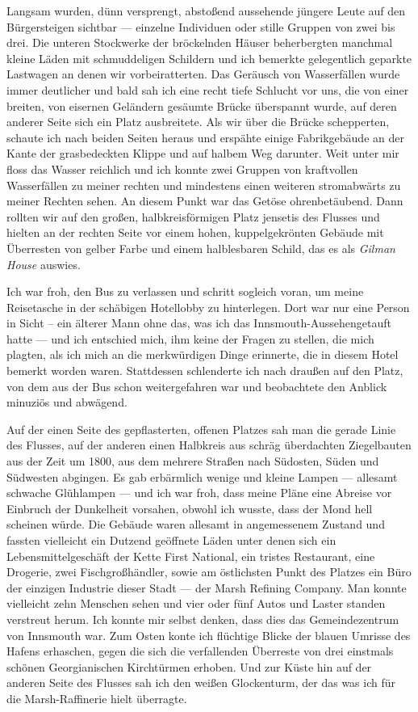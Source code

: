 Langsam wurden, dünn versprengt, abstoßend aussehende jüngere Leute auf den Bürgersteigen sichtbar --- einzelne Individuen oder stille Gruppen von zwei bis drei. Die unteren Stockwerke der bröckelnden Häuser beherbergten manchmal kleine Läden mit schmuddeligen Schildern und ich bemerkte gelegentlich geparkte Lastwagen an denen wir vorbeiratterten. Das Geräusch von Wasserfällen wurde immer deutlicher und bald sah ich eine recht tiefe Schlucht vor uns, die von einer breiten, von eisernen Geländern gesäumte Brücke überspannt wurde, auf deren anderer Seite sich ein Platz ausbreitete. Als wir über die Brücke schepperten, schaute ich nach beiden Seiten heraus und erspähte einige Fabrikgebäude an der Kante der grasbedeckten Klippe und auf halbem Weg darunter. Weit unter mir floss das Wasser reichlich und ich konnte zwei Gruppen von kraftvollen Wasserfällen zu meiner rechten und mindestens einen weiteren stromabwärts zu meiner Rechten sehen. An diesem Punkt war das Getöse ohrenbetäubend. Dann rollten wir auf den großen, halbkreisförmigen Platz jensetis des Flusses und hielten an der rechten Seite vor einem hohen, kuppelgekrönten Gebäude mit Überresten von gelber Farbe und einem halblesbaren Schild, das es als \textit{Gilman House} auswies.

Ich war froh, den Bus zu verlassen und schritt sogleich voran, um meine Reisetasche in der schäbigen Hotellobby zu hinterlegen. Dort war nur eine Person in Sicht -- ein älterer Mann ohne das, was ich das \glqq Innsmouth-Aussehen\grqq  getauft hatte --- und ich entschied mich, ihm keine der Fragen zu stellen, die mich plagten, als ich mich an die merkwürdigen Dinge erinnerte, die in diesem Hotel bemerkt worden waren. Stattdessen schlenderte ich nach draußen auf den Platz, von dem aus der Bus schon weitergefahren war und beobachtete den Anblick minuziös und abwägend.

Auf der einen Seite des gepflasterten, offenen Platzes sah man die gerade Linie des Flusses, auf der anderen einen Halbkreis aus schräg überdachten Ziegelbauten aus der Zeit um 1800, aus dem mehrere Straßen nach Südosten, Süden und Südwesten abgingen. Es gab erbärmlich wenige und kleine Lampen --- allesamt schwache Glühlampen --- und ich war froh, dass meine Pläne eine Abreise vor Einbruch der Dunkelheit vorsahen, obwohl ich wusste, dass der Mond hell scheinen würde. Die Gebäude waren allesamt in angemessenem Zustand und fassten vielleicht ein Dutzend geöffnete Läden unter denen sich ein Lebensmittelgeschäft der Kette First National, ein tristes Restaurant, eine Drogerie, zwei Fischgroßhändler, sowie am östlichsten Punkt des Platzes ein Büro der einzigen Industrie dieser Stadt --- der Marsh Refining Company. Man konnte vielleicht zehn Menschen sehen und vier oder fünf Autos und Laster standen verstreut herum. Ich konnte mir selbst denken, dass dies das Gemeindezentrum von Innsmouth war. Zum Osten konte ich flüchtige Blicke der blauen Umrisse des Hafens erhaschen, gegen die sich die verfallenden Überreste von drei einstmals schönen Georgianischen Kirchtürmen erhoben. Und zur Küste hin auf der anderen Seite des Flusses sah ich den weißen Glockenturm, der das was ich für die Marsh-Raffinerie hielt überragte.

